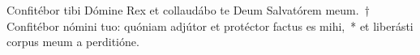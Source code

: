 \lettrine{C}{o}nfitébor tibi Dómine Rex et collaudábo te Deum Salvatórem meum.~† Confitébor nómini tuo: quóniam adjútor et protéctor factus es mihi,~* et liberásti corpus meum a perditióne.